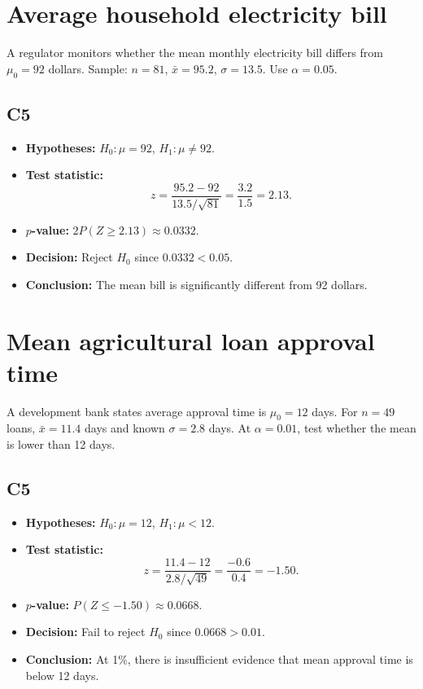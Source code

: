 \begin{ExamProblems}
\item
\section{Average household electricity bill}
A regulator monitors whether the mean monthly electricity bill differs from \(\mu_0=92\) dollars. Sample: \(n=81\), \(\bar x=95.2\), \(\sigma=13.5\). Use \(\alpha=0.05\).

\subsection*{C5}
\begin{itemize}
    \item \textbf{Hypotheses:} \(H_0\colon \mu=92\), \(H_1\colon \mu\ne 92\).
    \item \textbf{Test statistic:}
    \[
    z=\frac{95.2-92}{13.5/\sqrt{81}}=\frac{3.2}{1.5}=2.13.
    \]
    \item \textbf{\(p\)-value:} \(2P(Z\ge 2.13)\approx 0.0332\).
    \item \textbf{Decision:} Reject \(H_0\) since \(0.0332<0.05\).
    \item \textbf{Conclusion:} The mean bill is significantly different from 92 dollars.
\end{itemize}

\item
\section{Mean agricultural loan approval time}
A development bank states average approval time is \(\mu_0=12\) days. For \(n=49\) loans, \(\bar x=11.4\) days and known \(\sigma=2.8\) days. At \(\alpha=0.01\), test whether the mean is lower than 12 days.

\subsection*{C5}
\begin{itemize}
    \item \textbf{Hypotheses:} \(H_0\colon \mu=12\), \(H_1\colon \mu<12\).
    \item \textbf{Test statistic:}
    \[
    z=\frac{11.4-12}{2.8/\sqrt{49}}=\frac{-0.6}{0.4}=-1.50.
    \]
    \item \textbf{\(p\)-value:} \(P(Z\le -1.50)\approx 0.0668\).
    \item \textbf{Decision:} Fail to reject \(H_0\) since \(0.0668>0.01\).
    \item \textbf{Conclusion:} At 1\%, there is insufficient evidence that mean approval time is below 12 days.
\end{itemize}


\end{ExamProblems}
